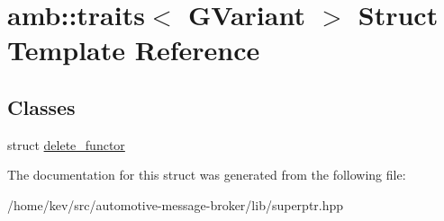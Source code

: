 \hypertarget{structamb_1_1traits_3_01GVariant_01_4}{\section{amb\+:\+:traits$<$ G\+Variant $>$ Struct Template Reference}
\label{structamb_1_1traits_3_01GVariant_01_4}
}
\subsection*{Classes}
\begin{DoxyCompactItemize}
\item 
struct \hyperlink{structamb_1_1traits_3_01GVariant_01_4_1_1delete__functor}{delete\+\_\+functor}
\end{DoxyCompactItemize}


The documentation for this struct was generated from the following file\+:\begin{DoxyCompactItemize}
\item 
/home/kev/src/automotive-\/message-\/broker/lib/superptr.\+hpp\end{DoxyCompactItemize}
